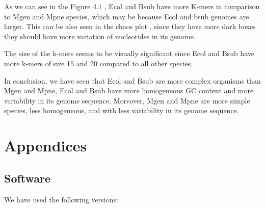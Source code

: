 \documentclass[10pt,a4paper,]{article}
\newenvironment{Shaded}{}{}
\newcommand{\CommentTok}[1]{\textcolor[rgb]{0.38,0.63,0.69}{\textit{#1}}}
\newcommand{\ExtensionTok}[1]{#1}
\newcommand{\FunctionTok}[1]{\textcolor[rgb]{0.02,0.16,0.49}{#1}}
\newcommand{\NormalTok}[1]{#1}
\begin{document}
As we can see in the Figure 4.1 \pageref{fig:rplots}, Ecol and Bsub have
more K-mers in comparison to Mgen and Mpne species, which may be because
Ecol and bsub genomes are larger. This can be also seen in the chaos
plot \pageref{fig:chaosplot}, since they have more dark boxes they
should have more variation of nucleotides in its genome.

The size of the k-mers seems to be visually significant since Ecol and
Bsub have more k-mers of size 15 and 20 compared to all other species.

In conclusion, we have seen that Ecol and Bsub are more complex
organisms than Mgen and Mpne, Ecol and Bsub have more homogeneous GC
content and more variability in its genome sequence. Moreover, Mgen and
Mpne are more simple species, less homogeneous, and with less
variability in its genome sequence.

\clearpage

\hypertarget{appendices}{%
\section{Appendices}\label{appendices}}

\label{sec:appendices}

\hypertarget{software}{%
\subsection{Software}\label{software}}

We have used the following versions:

\begin{Shaded}
\end{Shaded}
\end{document}
